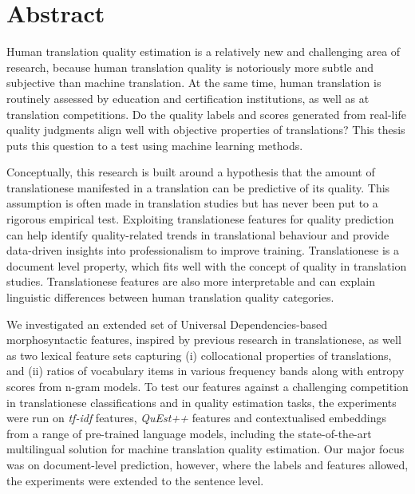 

\chapter*{Abstract}
Human translation quality estimation is a relatively new and challenging area of research, because human translation quality is notoriously more subtle and subjective than machine translation. At the same time, human translation is routinely assessed by education and certification institutions, as well as at translation competitions. Do the quality labels and scores generated from real-life quality judgments align well with objective properties of translations? This thesis puts this question to a test using machine learning methods.

Conceptually, this research is built around a hypothesis that the amount of translationese manifested in a translation can be predictive of its quality. This assumption is often made in translation studies but has never been put to a rigorous empirical test. Exploiting translationese features for quality prediction can help identify quality-related trends in translational behaviour and provide data-driven insights into professionalism to improve training. Translationese is a document level property, which fits well with the concept of quality in translation studies. Translationese features are also more interpretable and can explain linguistic differences between human translation quality categories.

We investigated an extended set of Universal Dependencies-based morphosyntactic features, inspired by previous research in translationese, as well as two lexical feature sets capturing (i) collocational properties of translations, and (ii) ratios of vocabulary items in various frequency bands along with entropy scores from n-gram models. To test our features against a challenging competition in translationese classifications and in quality estimation tasks, the experiments were run on \textit{tf-idf} features, \textit{QuEst++} features and contextualised embeddings from a range of pre-trained language models, including the state-of-the-art multilingual solution for machine translation quality estimation. Our major focus was on document-level prediction, however, where the labels and features allowed, the experiments were extended to the sentence level.

